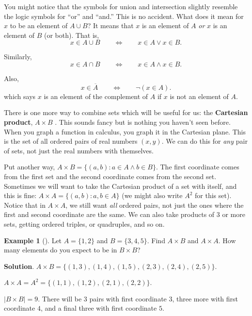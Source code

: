 \documentclass[10pt,]{book}
\newcommand{\terminology}[1]{\textbf{#1}}
\theoremstyle{plain}
\theoremstyle{definition}
\theoremstyle{definition}
\newtheorem{example}[theorem]{Example}
\theoremstyle{definition}
\theoremstyle{definition}
\numberwithin{equation}{chapter}
\def\st{:}
\def\Iff{\Leftrightarrow}
\def\bar{\overline}
\begin{document}
\hypertarget{p-1517}{}%
You might notice that the symbols for union and intersection slightly resemble the logic symbols for ``or'' and ``and.'' This is no accident. What does it mean for \(x\) to be an element of \(A\cup B\)? It means that \(x\) is an element of \(A\) \emph{or} \(x\) is an element of \(B\) (or both). That is,%
\begin{equation*}
x \in A \cup B \qquad \Iff \qquad x \in A \vee x \in B.
\end{equation*}
%
\par
\hypertarget{p-1518}{}%
Similarly,%
\begin{equation*}
x \in A \cap B \qquad \Iff \qquad x \in A \wedge x \in B.
\end{equation*}
%
\par
\hypertarget{p-1519}{}%
Also,%
\begin{equation*}
x \in \bar A \qquad \Iff \qquad \neg (x \in A).
\end{equation*}
which says \(x\) is an element of the complement of \(A\) if \(x\) is not an element of \(A\).%
\par
\hypertarget{p-1520}{}%
There is one more way to combine sets which will be useful for us: the \terminology{Cartesian product}, \(A \times B\)\label{notation-33}
. This sounds fancy but is nothing you haven't seen before. When you graph a function in calculus, you graph it in the Cartesian plane. This is the set of all ordered pairs of real numbers \((x,y)\). We can do this for \emph{any} pair of sets, not just the real numbers with themselves.%
\par
\hypertarget{p-1521}{}%
Put another way, \(A \times B = \{(a,b) \st a \in A \wedge b \in B\}\). The first coordinate comes from the first set and the second coordinate comes from the second set. Sometimes we will want to take the Cartesian product of a set with itself, and this is fine: \(A \times A = \{(a,b) \st a, b \in A\}\) (we might also write \(A^2\) for this set). Notice that in \(A \times A\), we still want \emph{all} ordered pairs, not just the ones where the first and second coordinate are the same. We can also take products of 3 or more sets, getting ordered triples, or quadruples, and so on.%
\begin{example}[]\label{example-44}
\hypertarget{p-1522}{}%
Let \(A = \{1,2\}\) and \(B = \{3,4,5\}\). Find \(A \times B\) and \(A \times A\). How many elements do you expect to be in \(B \times B\)?%
\par\smallskip%
\noindent\textbf{Solution}.\hypertarget{solution-133}{}\quad%
\hypertarget{p-1523}{}%
\(A \times B = \{(1,3), (1,4), (1,5), (2,3), (2,4), (2,5)\}\).%
\par
\hypertarget{p-1524}{}%
\(A \times A = A^2 = \{(1,1), (1,2), (2,1), (2,2)\}\).%
\par
\hypertarget{p-1525}{}%
\(|B\times B| = 9\). There will be 3 pairs with first coordinate \(3\), three more with first coordinate \(4\), and a final three with first coordinate \(5\).%
\end{example}
\typeout{************************************************}
\typeout{************************************************}
\end{document}
